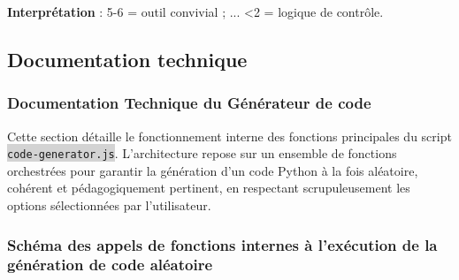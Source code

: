 \documentclass[11pt,a4paper]{article}
\newcommand{\code}[1]{\colorbox{lightgray}{\texttt{\small #1}}}
\begin{document}
\textbf{Interprétation} : 5-6 = outil convivial ; ... <2 = logique de contrôle.


\subsection{Documentation technique}

\subsubsection{Documentation Technique du Générateur de code}
Cette section détaille le fonctionnement interne des fonctions principales du script \code{code-generator.js}. L'architecture repose sur un ensemble de fonctions orchestrées pour garantir la génération d'un code Python à la fois aléatoire, cohérent et pédagogiquement pertinent, en respectant scrupuleusement les options sélectionnées par l'utilisateur.

\subsubsection*{Schéma des appels de fonctions internes à l'exécution de la génération de code aléatoire}

%
\end{document}

